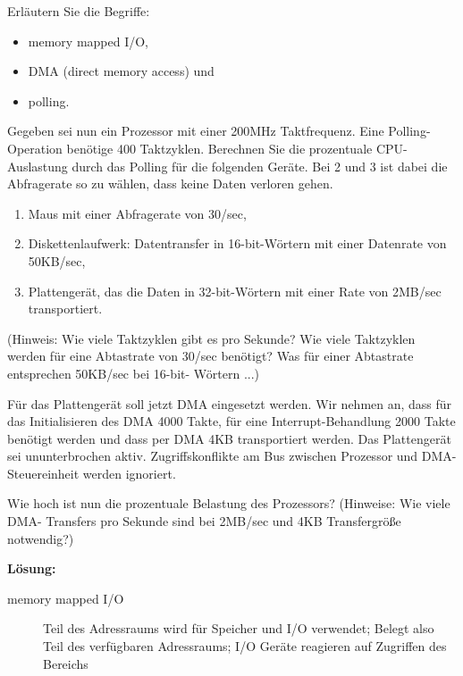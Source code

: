 

\begin{description}

Erläutern Sie die Begriffe: 
    \begin{itemize}
      \item memory mapped I/O,  
      \item DMA (direct memory access) und 
      \item polling. 
    \end{itemize}
Gegeben sei nun ein Prozessor mit einer 200MHz Taktfrequenz. Eine Polling-Operation 
benötige 400 Taktzyklen. Berechnen Sie die prozentuale CPU-Auslastung durch das Polling für die folgenden Geräte. Bei 2 und 3 ist dabei die Abfragerate so zu wählen, dass keine Daten verloren gehen. 
    \begin{enumerate}[label=\arabic*.]
      \item Maus mit einer Abfragerate von 30/sec, 
      \item Diskettenlaufwerk: Datentransfer in 16-bit-Wörtern mit einer Datenrate von 50KB/sec, 
      \item Plattengerät, das die Daten in 32-bit-Wörtern mit einer Rate von 2MB/sec transportiert. 
    \end{enumerate}
(Hinweis: Wie viele Taktzyklen gibt es pro Sekunde? Wie viele Taktzyklen werden für eine 
Abtastrate von 30/sec benötigt? Was für einer Abtastrate entsprechen 50KB/sec bei 16-bit-
Wörtern ...) 

Für das Plattengerät soll jetzt DMA eingesetzt werden. Wir nehmen an, dass für das 
Initialisieren des DMA 4000 Takte, für eine Interrupt-Behandlung 2000 Takte benötigt werden und dass per DMA 4KB transportiert werden. Das Plattengerät sei ununterbrochen aktiv. 
Zugriffskonflikte am Bus zwischen Prozessor und DMA-Steuereinheit werden ignoriert. 

Wie hoch ist nun die prozentuale Belastung des Prozessors? (Hinweise: Wie viele DMA-
Transfers pro Sekunde sind bei 2MB/sec und 4KB Transfergröße notwendig?) 

\textbf{Lösung:}
    \begin{description}
      \item[memory mapped I/O]
        Teil des Adressraums wird für Speicher und I/O verwendet; Belegt also Teil des verfügbaren Adressraums; I/O Geräte reagieren auf Zugriffen des Bereichs


\end{description}
\end{description}
